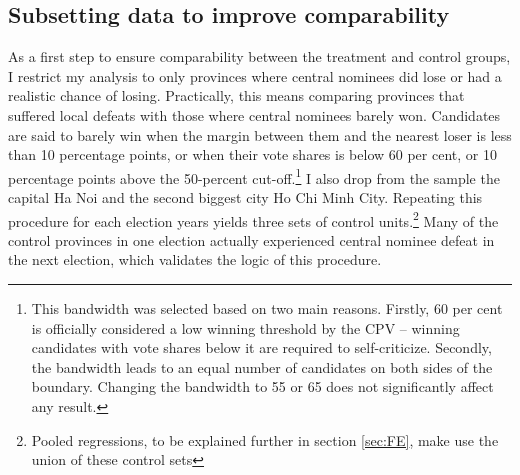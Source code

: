 \documentclass[12pt]{article}\usepackage[]{graphicx}\usepackage[]{color}
\newcommand{\1}{\mathbbm{1}}
\begin{document}
\subsection{Subsetting data to improve comparability}
As a first step to ensure comparability between the treatment and control groups, I restrict my analysis to only provinces where central nominees did lose or had a realistic chance of losing.  Practically, this means comparing provinces that suffered local defeats with those where central nominees barely won. Candidates are said to barely win when the margin between them and the nearest loser is less than 10 percentage points, or when their vote shares is below 60 per cent, or 10 percentage points above the 50-percent cut-off.\footnote{This bandwidth was selected based on two main reasons. Firstly, 60 per cent is officially considered a low winning threshold by the CPV – winning candidates with vote shares below it are required to self-criticize. Secondly, the bandwidth leads to an equal number of candidates on both sides of the boundary. Changing the bandwidth to 55 or 65 does not significantly affect any result.} I also drop from the sample the capital Ha Noi and the second biggest city Ho Chi Minh City. Repeating this procedure for each election years yields three sets of control units.\footnote{Pooled regressions, to be explained further in section \ref{sec:FE}, make use the union of these control sets} Many of the control provinces in one election actually experienced central nominee defeat in the next election, which validates the logic of this procedure.
\end{document}
